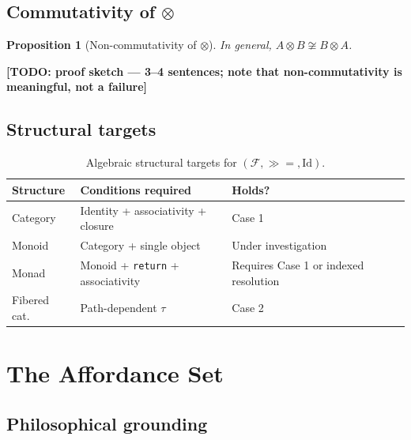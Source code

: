 \documentclass[11pt, a4paper]{article}
\theoremstyle{plain}
\newtheorem{proposition}[theorem]{Proposition}
\theoremstyle{definition}
\theoremstyle{remark}
\newcommand{\bind}{\mathbin{\gg\!=}}          %
\newcommand{\tensor}{\otimes}                  %
\newcommand{\nullfut}{\mathrm{Id}}             %
\newcommand{\Fut}{\mathcal{F}}                 %
\newcommand{\traj}{\tau}                       %
\begin{document}
\subsection{Commutativity of $\tensor$}

\begin{proposition}[Non-commutativity of $\tensor$]
\label{prop:noncomm}
In general, $A \tensor B \not\cong B \tensor A$.
\end{proposition}


\textbf{[TODO: proof sketch — 3--4 sentences; note that non-commutativity
is meaningful, not a failure]}

\subsection{Structural targets}

\begin{table}[h]
\centering
\caption{Algebraic structural targets for $(\Fut, \bind, \nullfut)$.}
\label{tab:structures}
\smallskip
\begin{tabular}{llll}
\toprule
Structure & Conditions required & Holds? \\
\midrule
Category      & Identity + associativity + closure & Case 1 \\
Monoid        & Category + single object            & Under investigation \\
Monad         & Monoid + \texttt{return} + associativity & Requires Case 1 or indexed resolution \\
Fibered cat.  & Path-dependent $\traj$              & Case 2 \\
\bottomrule
\end{tabular}
\end{table}

\section{The Affordance Set}
\label{sec:affordance}

\subsection{Philosophical grounding}
\end{document}
